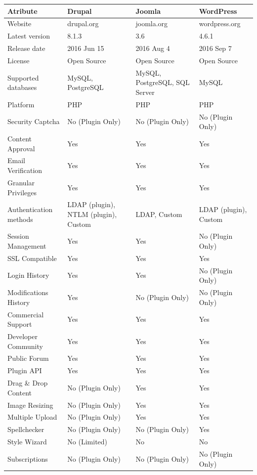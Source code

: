 \documentclass[12pt]{report}
\begin{document}
\begin{itemize}
\tiny
\begin{longtable}[H]{|| p{.3\linewidth} | p{.19\linewidth} | p{.19\linewidth} | p{.19\linewidth} ||}
\hline
\textbf{Atribute} & \textbf{Drupal} & \textbf{Joomla} & \textbf{WordPress} \\
\hline\hline \endhead
Website & drupal.org & joomla.org & wordpress.org \\
Latest version & 8.1.3 & 3.6 & 4.6.1 \\
Release date & 2016 Jun 15 & 2016 Aug 4 & 2016 Sep 7 \\
License & Open Source & Open Source & Open Source \\
Supported databases & MySQL, PostgreSQL & MySQL, PostgreSQL, SQL Server & MySQL \\
Platform & PHP & PHP & PHP \\
Security Captcha & No (Plugin Only) & No (Plugin Only) & No (Plugin Only) \\
Content Approval & Yes & Yes & Yes \\
Email Verification & Yes & Yes & Yes \\
Granular Privileges & Yes & Yes & Yes \\
Authentication methods & LDAP (plugin), NTLM (plugin), Custom & LDAP, Custom & LDAP (plugin), Custom \\
Session Management & Yes & Yes & No (Plugin Only) \\
SSL Compatible & Yes & Yes & Yes \\
Login History & Yes & Yes & No (Plugin Only) \\
Modifications History & Yes & No (Plugin Only) & No (Plugin Only) \\
Commercial Support & Yes & Yes & Yes \\
Developer Community & Yes & Yes & Yes \\
Public Forum & Yes & Yes & Yes \\
Plugin API & Yes & Yes & Yes \\
Drag \& Drop Content & No (Plugin Only) & Yes & Yes \\
Image Resizing & No (Plugin Only) & Yes & Yes \\
Multiple Upload & No (Plugin Only) & Yes & Yes \\
Spellchecker & No (Plugin Only) & No (Plugin Only) & Yes \\
Style Wizard & No (Limited) & No & No \\
Subscriptions & No (Plugin Only) & No (Plugin Only) & No (Plugin Only) \\

\end{longtable}
\end{itemize}
\end{document}
